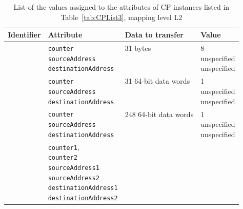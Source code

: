 \documentclass{llncs}
\begin{document}
\begin{table}[!htbp]
\centering
\caption{List of the values assigned to the attributes of CP instances listed in Table~\ref{tab:CPList3}, mapping level L2}
\label{tab:CPList4}
\begin{tabular}{| >{\centering\arraybackslash}p{2cm} | >{\centering\arraybackslash}p{4cm} | >{\centering\arraybackslash}p{4cm} |
>{\centering\arraybackslash}p{2cm} |}
	\hline
		\textbf{Identifier}	& \textbf{Attribute} & \textbf{Data to transfer} & \textbf{Value} \\ \hline
		\multirow{4}{*}{\textbf{CP01}} & \parbox[t]{4cm}{\texttt{counter}\\\texttt{sourceAddress}\\\texttt{destinationAddress}\\} &
		\parbox[t]{4cm}{31 bytes\\ \\ \\} &
		\parbox[t]{4cm}{8\\unspecified\\unspecified\\} \\ \hline
		 & \parbox[t]{4cm}{\texttt{counter}\\\texttt{sourceAddress}\\\texttt{destinationAddress}\\} &
		\parbox[t]{4cm}{31 64-bit data words\\ \\ \\} &
		\parbox[t]{4cm}{1\\unspecified\\unspecified\\} \\ \hline
		 & \parbox[t]{4cm}{\texttt{counter}\\\texttt{sourceAddress}\\\texttt{destinationAddress}\\} &
		\parbox[t]{4cm}{248 64-bit data words\\ \\ \\} &
		\parbox[t]{4cm}{1\\unspecified\\unspecified\\} \\ \hline
		 &
		\parbox[t]{4cm}{\texttt{counter1},\\\texttt{counter2}\\\texttt{sourceAddress1}\\\texttt{sourceAddress2}\\\texttt{destinationAddress1}\\\texttt{destinationAddress2}\\} &

\end{tabular}
\end{table}
\end{document}
